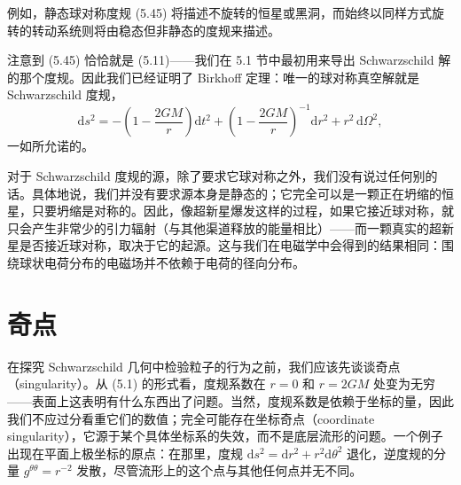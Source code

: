 例如，静态球对称度规 (5.45) 将描述不旋转的恒星或黑洞，而始终以同样方式旋转的转动系统则将由稳态但非静态的度规来描述。

注意到 (5.45) 恰恰就是 (5.11)——我们在 5.1 节中最初用来导出 Schwarzschild 解的那个度规。因此我们已经证明了 Birkhoff 定理：唯一的球对称真空解就是 Schwarzschild 度规，
\begin{equation*}
\mathrm{d}s^2 = -\left(1 - \frac{2GM}{r}\right)\mathrm{d}t^2 + \left(1 - \frac{2GM}{r}\right)^{-1}\mathrm{d}r^2 + r^2\,\mathrm{d}\Omega^2,
\tag{5.49}
\end{equation*}
一如所允诺的。

对于 Schwarzschild 度规的源，除了要求它球对称之外，我们没有说过任何别的话。具体地说，我们并没有要求源本身是静态的；它完全可以是一颗正在坍缩的恒星，只要坍缩是对称的。因此，像超新星爆发这样的过程，如果它接近球对称，就只会产生非常少的引力辐射（与其他渠道释放的能量相比）——而一颗真实的超新星是否接近球对称，取决于它的起源。这与我们在电磁学中会得到的结果相同：围绕球状电荷分布的电磁场并不依赖于电荷的径向分布。

\section{奇点}

在探究 Schwarzschild 几何中检验粒子的行为之前，我们应该先谈谈奇点（singularity）。从 (5.1) 的形式看，度规系数在 $r = 0$ 和 $r = 2GM$ 处变为无穷——表面上这表明有什么东西出了问题。当然，度规系数是依赖于坐标的量，因此我们不应过分看重它们的数值；完全可能存在坐标奇点（coordinate singularity），它源于某个具体坐标系的失效，而不是底层流形的问题。一个例子出现在平面上极坐标的原点：在那里，度规 $\mathrm{d}s^2 = \mathrm{d}r^2 + r^2\mathrm{d}\theta^2$ 退化，逆度规的分量 $g^{\theta\theta} = r^{-2}$ 发散，尽管流形上的这个点与其他任何点并无不同。

